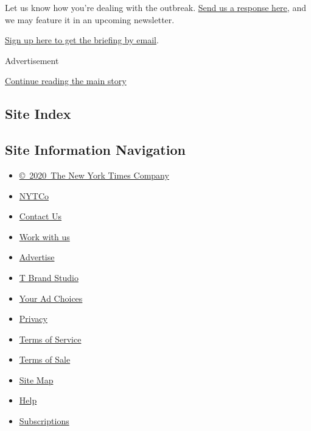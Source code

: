 Let us know how you're dealing with the outbreak.
\href{https://www.nytimes.com/2020/03/02/reader-center/coronavirus-preparation.html}{Send
us a response here}, and we may feature it in an upcoming newsletter.

\href{https://www.nytimes.com/newsletters/coronavirus-briefing}{Sign up
here to get the briefing by email}.

Advertisement

\protect\hyperlink{after-bottom}{Continue reading the main story}

\hypertarget{site-index}{%
\subsection{Site Index}\label{site-index}}

\hypertarget{site-information-navigation}{%
\subsection{Site Information
Navigation}\label{site-information-navigation}}

\begin{itemize}
\tightlist
\item
  \href{https://help.nytimes.com/hc/en-us/articles/115014792127-Copyright-notice}{©~2020~The
  New York Times Company}
\end{itemize}

\begin{itemize}
\tightlist
\item
  \href{https://www.nytco.com/}{NYTCo}
\item
  \href{https://help.nytimes.com/hc/en-us/articles/115015385887-Contact-Us}{Contact
  Us}
\item
  \href{https://www.nytco.com/careers/}{Work with us}
\item
  \href{https://nytmediakit.com/}{Advertise}
\item
  \href{http://www.tbrandstudio.com/}{T Brand Studio}
\item
  \href{https://www.nytimes.com/privacy/cookie-policy\#how-do-i-manage-trackers}{Your
  Ad Choices}
\item
  \href{https://www.nytimes.com/privacy}{Privacy}
\item
  \href{https://help.nytimes.com/hc/en-us/articles/115014893428-Terms-of-service}{Terms
  of Service}
\item
  \href{https://help.nytimes.com/hc/en-us/articles/115014893968-Terms-of-sale}{Terms
  of Sale}
\item
  \href{https://spiderbites.nytimes.com}{Site Map}
\item
  \href{https://help.nytimes.com/hc/en-us}{Help}
\item
  \href{https://www.nytimes.com/subscription?campaignId=37WXW}{Subscriptions}
\end{itemize}
